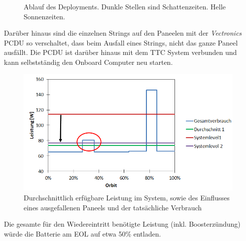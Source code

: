 \documentclass[twoside]{article}
\begin{document}
\begin{multicols}{2}
\begin{figure}[H]
            \caption{Ablauf des Deployments. Dunkle Stellen sind Schattenzeiten. Helle Sonnenzeiten.}
            \label{fig:deploy}
         \end{figure}
         Darüber hinaus sind die einzelnen Strings auf den Paneelen mit der \textit{Vectronics} PCDU so verschaltet, dass beim Ausfall eines Strings, nicht das ganze Paneel ausfällt. Die PCDU ist darüber hinaus mit dem TTC System verbunden und kann selbstständig den Onboard Computer neu starten.\\
         \begin{figure}[H]
            \captionsetup{format=plain}
            \centering
            \includegraphics[width=\linewidth]{Fail-Case.png}       
            \caption{Durchschnittlich erfügbare Leistung im System, sowie des Einflusses eines ausgefallenen Paneels und der tatsächliche Verbrauch}
            \label{fig:fail}
         \end{figure}
         Die gesamte für den Wiedereintritt benötigte Leistung (inkl. Boosterzündung) würde die Batterie am EOL auf etwa 50\% entladen. 



\end{multicols}
\end{document}
